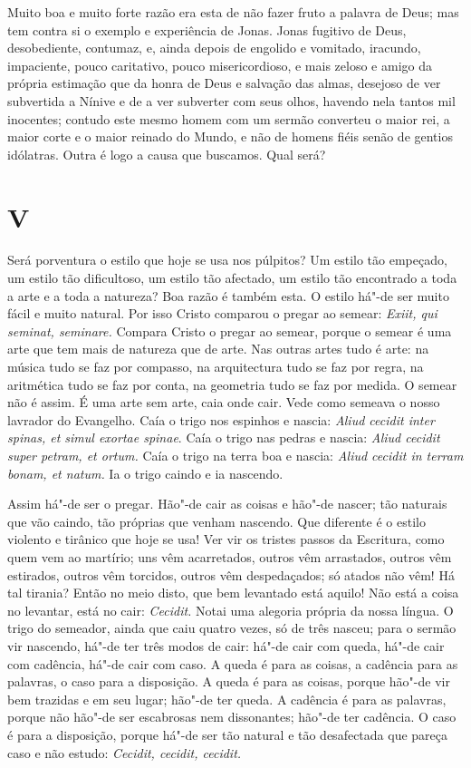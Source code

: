 Muito boa e muito forte razão era esta de não fazer fruto a
palavra de Deus; mas tem contra si o exemplo e experiência de
Jonas. Jonas fugitivo de Deus, desobediente, contumaz, e, ainda depois
de engolido e vomitado, iracundo, impaciente, pouco caritativo, pouco
misericordioso, e mais zeloso e amigo da própria estimação que da honra
de Deus e salvação das almas, desejoso de ver subvertida a Nínive e de a
ver subverter com seus olhos, havendo nela tantos mil inocentes; contudo
este mesmo homem com um sermão converteu o maior rei, a maior corte e o
maior reinado do Mundo, e não de homens fiéis senão de gentios idólatras. Outra é logo a causa que buscamos. Qual será?

\section*{V}

Será porventura o estilo que hoje se usa nos púlpitos? Um estilo tão
empeçado, um estilo tão dificultoso, um estilo tão afectado, um estilo
tão encontrado a toda a arte e a toda a natureza? Boa razão é também
esta. O estilo há"-de ser muito fácil e muito natural. Por isso Cristo
comparou o pregar ao semear: \emph{Exiit, qui seminat, seminare.}
Compara Cristo o pregar ao semear, porque o semear é uma arte que tem
mais de natureza que de arte. Nas outras artes tudo é arte: na música
tudo se faz por compasso, na arquitectura tudo se faz por regra, na
aritmética tudo se faz por conta, na geometria tudo se faz por medida.
O semear não é assim. É uma arte sem arte, caia onde cair. Vede como
semeava o nosso lavrador do Evangelho. Caía o trigo nos espinhos e
nascia: \emph{Aliud cecidit inter spinas, et simul exortae spinae}.
Caía o trigo nas pedras e nascia: \emph{Aliud cecidit super petram,
et ortum.} Caía o trigo na terra boa e nascia: \emph{Aliud cecidit
in terram bonam, et natum.} Ia o trigo caindo e ia nascendo.

Assim há"-de ser o pregar. Hão"-de cair as coisas e hão"-de nascer; tão
naturais que vão caindo, tão próprias que venham nascendo. Que
diferente é o estilo violento e tirânico que hoje se usa! Ver vir os
tristes passos da Escritura, como quem vem ao martírio; uns vêm
acarretados, outros vêm arrastados, outros vêm estirados, outros vêm
torcidos, outros vêm despedaçados; só atados não vêm! Há tal tirania?
Então no meio disto, que bem levantado está aquilo! Não está a coisa no
levantar, está no cair: \emph{Cecidit.} Notai uma alegoria própria da
nossa língua. O trigo do semeador, ainda
que caiu quatro vezes, só de três nasceu; para o sermão vir nascendo,
há"-de ter três modos de cair: há"-de cair com queda, há"-de cair com
cadência, há"-de cair com caso. A queda é para as coisas, a cadência para
as palavras, o caso para a disposição. A queda é para as coisas, porque
hão"-de vir bem trazidas e em seu lugar; hão"-de ter queda. A cadência é
para as palavras, porque não hão"-de ser escabrosas nem dissonantes;
hão"-de ter cadência. O caso é para a disposição, porque há"-de ser tão
natural e tão desafectada que pareça caso e não estudo: \emph{Cecidit,
cecidit, cecidit.}

